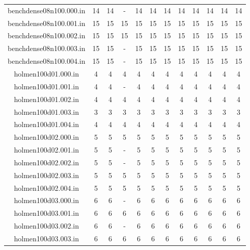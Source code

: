 \documentclass[landscape, 12pt]{report}
\begin{document}
\begin{tabular}{|c|c|c|c|c|c|c|c|c|c|c|c|}
benchdense08n100.000.in &   14 &   14 &    - &   14 &   14 &   14 &   14 &   14 &   14 &   14 &   14
\\
benchdense08n100.001.in &   15 &   15 &   15 &   15 &   15 &   15 &   15 &   15 &   15 &   15 &   15
\\
benchdense08n100.002.in &   15 &   15 &   15 &   15 &   15 &   15 &   15 &   15 &   15 &   15 &   15
\\
benchdense08n100.003.in &   15 &   15 &    - &   15 &   15 &   15 &   15 &   15 &   15 &   15 &   15
\\
benchdense08n100.004.in &   15 &   15 &    - &   15 &   15 &   15 &   15 &   15 &   15 &   15 &   15
\\
holmen100d01.000.in &    4 &    4 &    4 &    4 &    4 &    4 &    4 &    4 &    4 &    4 &    4
\\
holmen100d01.001.in &    4 &    4 &    - &    4 &    4 &    4 &    4 &    4 &    4 &    4 &    4
\\
holmen100d01.002.in &    4 &    4 &    4 &    4 &    4 &    4 &    4 &    4 &    4 &    4 &    4
\\
holmen100d01.003.in &    3 &    3 &    3 &    3 &    3 &    3 &    3 &    3 &    3 &    3 &    3
\\
holmen100d01.004.in &    4 &    4 &    4 &    4 &    4 &    4 &    4 &    4 &    4 &    4 &    4
\\
holmen100d02.000.in &    5 &    5 &    5 &    5 &    5 &    5 &    5 &    5 &    5 &    5 &    5
\\
holmen100d02.001.in &    5 &    5 &    - &    5 &    5 &    5 &    5 &    5 &    5 &    5 &    5
\\
holmen100d02.002.in &    5 &    5 &    - &    5 &    5 &    5 &    5 &    5 &    5 &    5 &    5
\\
holmen100d02.003.in &    5 &    5 &    5 &    5 &    5 &    5 &    5 &    5 &    5 &    5 &    5
\\
holmen100d02.004.in &    5 &    5 &    5 &    5 &    5 &    5 &    5 &    5 &    5 &    5 &    5
\\
holmen100d03.000.in &    6 &    6 &    - &    6 &    6 &    6 &    6 &    6 &    6 &    6 &    6
\\
holmen100d03.001.in &    6 &    6 &    6 &    6 &    6 &    6 &    6 &    6 &    6 &    6 &    6
\\
holmen100d03.002.in &    6 &    6 &    - &    6 &    6 &    6 &    6 &    6 &    6 &    6 &    6
\\
holmen100d03.003.in &    6 &    6 &    6 &    6 &    6 &    6 &    6 &    6 &    6 &    6 &    6

\end{tabular}
\end{document}
